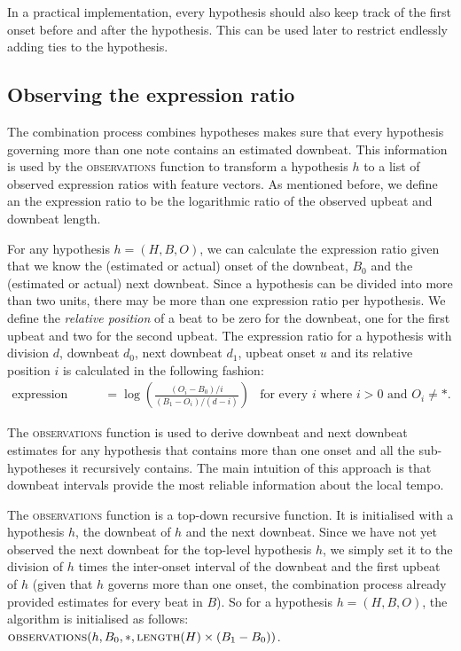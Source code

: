 In a practical implementation, every hypothesis should also keep track of the first onset before and after the hypothesis. This can be used later to restrict endlessly adding ties to the hypothesis.

\subsection{Observing the expression ratio}
\label{sec:observations}

The combination process combines hypotheses makes sure that every hypothesis governing more than one note contains an estimated downbeat. This information is used by the \textsc{observations} function to transform a hypothesis $h$ to a list of observed expression ratios with feature vectors. As mentioned before, we define an the expression ratio to be the logarithmic ratio of the observed upbeat and downbeat length.

For any hypothesis $h = (H, B, O)$, we can calculate the expression ratio given that we know the (estimated or actual) onset of the downbeat, $B_0$ and the (estimated or actual) next downbeat. Since a hypothesis can be divided into more than two units, there may be more than one expression ratio per hypothesis. We define the \textit{relative position} of a beat to be zero for the downbeat, one for the first upbeat and two for the second upbeat. The expression ratio for a hypothesis with division $d$, downbeat $d_0$, next downbeat $d_1$, upbeat onset $u$ and its relative position $i$ is calculated in the following fashion:
\begin{align}
\label{eq:expression}
\mbox{expression ratio} &= \log\left(\frac{(O_i - B_0) / i}{(B_1 - O_i) / (d - i)}\right) & \text{for every $i$ where $i > 0$ and $O_i \neq *$.}
\end{align}

The \textsc{observations} function is used to derive downbeat and next downbeat estimates for any hypothesis that contains more than one onset and all the sub-hypotheses it recursively contains. The main intuition of this approach is that downbeat intervals provide the most reliable information about the local tempo. 

The \textsc{observations} function is a top-down recursive function. It is initialised with a hypothesis $h$, the downbeat of $h$ and the next downbeat. Since we have not yet observed the next downbeat for the top-level hypothesis $h$, we simply set it to the division of $h$ times the inter-onset interval of the downbeat and the first upbeat of $h$ (given that $h$ governs more than one onset, the combination process already provided estimates for every beat in $B$). So for a hypothesis $h = (H, B, O)$, the algorithm is initialised as follows: $\textsc{observations}(h, B_0, *, \textsc{length}(H) \times (B_1 - B_0))$.

